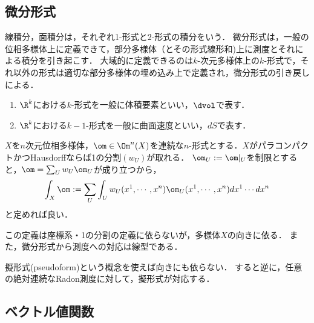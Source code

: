 \documentclass[uplatex,dvipdfmx]{jsreport}
\begin{document}
\subsection{微分形式}

\begin{tcolorbox}[colframe=ForestGreen, colback=ForestGreen!10!white,breakable,colbacktitle=ForestGreen!40!white,coltitle=black,fonttitle=\bfseries\sffamily,
title=]
    線積分，面積分は，それぞれ1-形式と2-形式の積分をいう．
    微分形式は，一般の位相多様体上に定義できて，部分多様体（とその形式線形和)上に測度とそれによる積分を引き起こす．
    大域的に定義できるのは$k$-次元多様体上の$k$-形式で，それ以外の形式は適切な部分多様体の埋め込み上で定義され，微分形式の引き戻しによる．
\end{tcolorbox}

\begin{definition}\mbox{}
    \begin{enumerate}
        \item $\R^k$における$k$-形式を一般に体積要素といい，$\dvol$で表す．
        \item $\R^k$における$k-1$-形式を一般に曲面速度といい，$dS$で表す．
    \end{enumerate}
\end{definition}

\begin{definition}[微分形式の積分]
    $X$を$n$次元位相多様体，$\om\in\Om^n(X)$を連続な$n$-形式とする．$X$がパラコンパクトかつHausdorffならば1の分割$(w_U)$が取れる．
    $\om_U:=\om|_{U}$を制限とすると，$\om=\sum_Uw_U\om_U$が成り立つから，
    \[\int_X\om:=\sum_U\int_Uw_U(x^1,\cdots,x^n)\om_U(x^1,\cdots,x^n)dx^1\cdots dx^n\]
    と定めれば良い．
\end{definition}

\begin{theorem}
    この定義は座標系・1の分割の定義に依らないが，多様体$X$の向きに依る．
    また，微分形式から測度への対応は線型である．
\end{theorem}
\begin{remark}
    擬形式(pseudoform)という概念を使えば向きにも依らない．
    すると逆に，任意の絶対連続なRadon測度に対して，擬形式が対応する．
\end{remark}

\subsection{ベクトル値関数}
\end{document}
